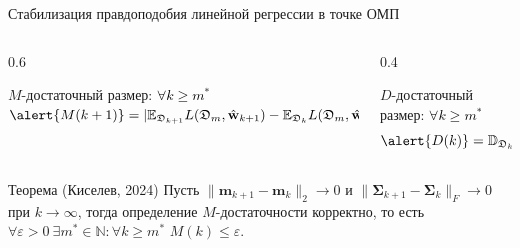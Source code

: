 \documentclass[aspectratio=169]{beamer}
\begin{document}
\begin{frame}{Стабилизация правдоподобия линейной регрессии в точке ОМП}
\begin{columns}[T]
    \begin{column}{0.6\textwidth}
        \hspace*{0.2em}
        \begin{minipage}{\linewidth}
        \begin{block}{$M$-достаточный размер: \textcolor{black}{$\forall k \geqslant m^*$}}
            $\alert{M(k+1)} = | \mathbb{E}_{\mathfrak{D}_{k+1}} L(\mathfrak{D}_{m}, \hat{\mathbf{w}}_{k+1}) - \mathbb{E}_{\mathfrak{D}_{k}} L(\mathfrak{D}_{m}, \hat{\mathbf{w}}_{k}) | \leqslant \varepsilon$
        \end{block}
        \end{minipage}
    \end{column}
    \vspace{0.2em}
    \begin{column}{0.4\textwidth}
        \begin{block}{$D$-достаточный размер: \textcolor{black}{$\forall k \geqslant m^*$}}
            \vspace{-2.3em}
            \begin{equation*}
                \alert{D(k)} = \mathbb{D}_{\mathfrak{D}_{k}} L(\mathfrak{D}_{m}, \hat{\mathbf{w}}_{k}) \leqslant \varepsilon
            \end{equation*}
        \end{block}
    \end{column}
\end{columns}
\vspace{-0.4em}
\begin{block}{Теорема (Киселев, 2024)}
Пусть $\| \mathbf{m}_{k+1} - \mathbf{m}_{k} \|_2 \to 0$ и $\| \boldsymbol{\Sigma}_{k+1} - \boldsymbol{\Sigma}_{k} \|_F \to 0$ при $k \to \infty$, тогда определение $M$-достаточности корректно, то есть $\forall \varepsilon > 0\ \exists m^* \in \mathbb{N}: \forall k \geqslant m^*$ $M(k) \leqslant \varepsilon$.
\end{block}
\end{frame}
\end{document}

